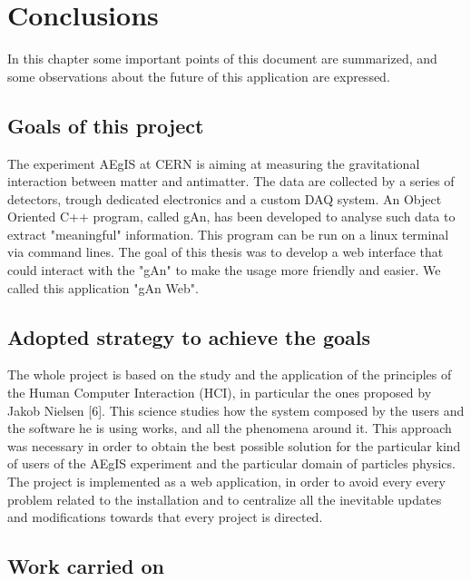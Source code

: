 
\chapter{Conclusions} %

\label{Chapter 10} %


In this chapter some important points of this document are summarized, and some observations about the future of this application are expressed.

\section{Goals of this project}
The experiment AEgIS at CERN is aiming at measuring the gravitational interaction between matter and antimatter. The data are collected by a series of detectors, trough dedicated electronics and a custom DAQ system. An Object Oriented C++ program, called gAn, has been developed to analyse such data to extract "meaningful" information. This program can be run on a linux terminal via command lines. The goal of this thesis was to develop a web interface that could interact with the "gAn" to make the usage more friendly and easier. We called this application "gAn Web". 

\section{Adopted strategy to achieve the goals}
The whole project is based on the study and the application of the principles of the Human Computer Interaction (HCI), in particular the ones proposed by Jakob Nielsen [6]. This science studies how the system composed by the users and the software he is using works, and all the phenomena around it. This approach was necessary in order to obtain the best possible solution for the particular kind of users of the AEgIS experiment and the particular domain of particles physics. 
The project is implemented as a web application, in order to avoid every every problem related to the installation and to centralize all the inevitable updates and modifications towards that every project is directed. 

\section{Work carried on}

